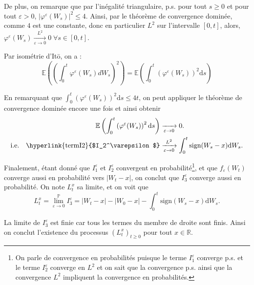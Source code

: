 \documentclass[openany]{book}
\makeatletter
\renewcommand{\P}{\mathds{P}}
\newcommand{\R}{\mathbb{R}}
\newcommand{\E}{\mathbb{E}}
\newcommand{\1}{\mathbbm{1}}
\newcommand{\sign}{\text{sign}}
\renewcommand{\d}{\mathrm{d}}
\renewenvironment{proof}[1][\textbf{\textit{Démonstration}}]{%
  \par\pushQED{\qed}%
  \normalfont\topsep6\p@\@plus6\p@\relax
  \trivlist\item[\hskip\labelsep
    #1\@addpunct{.}]\ignorespaces
}{%
  \popQED\endtrivlist\@endpefalse
}
\theoremstyle{thmfont}
\theoremstyle{deffont}
\theoremstyle{thmfont}
\theoremstyle{deffont}
\makeatother
\begin{document}
\begin{proof}
\noindent De plus, on remarque que par l'inégalité triangulaire, p.s. pour tout $s \geq 0$ et pour tout $\varepsilon > 0$, 
$|\varphi^\varepsilon(W_s)|^2 \leq 4$. Ainsi, par le théorème de convergence dominée, comme $4$ est une constante, donc en particulier $L^2$ sur l'intervalle $[0,t]$, alors, $\varphi^\varepsilon(W_s) \xrightarrow[\varepsilon \to 0]{L^2} 0\;\forall s \in [0,t]$.

\noindent Par isométrie d'Itō, on a :
$$\E\left(\left(\int_0^t \varphi^\varepsilon(W_s) dW_s\right)^2\right) = \E\left(\int_0^t\left(\varphi^\varepsilon(W_s)\right)^2\d s\right)$$

\noindent En remarquant que $\int_0^t \left(\varphi^\varepsilon(W_s)\right)^2\d s \leq 4t$, on peut appliquer le théorème de convergence dominée encore une fois et ainsi obtenir
\begin{align*}
  \E\left(\int_0^t\left(\varphi^\varepsilon(W_s)\right)^2\d s\right) &\xrightarrow[\varepsilon\to0]{} 0.\\
  \text{i.e.}\quad\text{\hyperlink{termI2}{$I_2^\varepsilon$}} &\xrightarrow[\varepsilon\to0]{L^2} \int_0^t \sign(W_s - x) \d W_s.
\end{align*}


\noindent Finalement, étant donné que \hyperlink{termI1}{$I_1^\varepsilon$} et \hyperlink{termI2}{$I_2^\varepsilon$} convergent en probabilité\footnote{On parle de convergence en probabilités puisque le terme \hyperlink{termI1}{$I_1^\varepsilon$} converge p.s. et le terme \hyperlink{termI2}{$I_2^\varepsilon$} converge en $L^2$ et on sait que la convergence p.s. ainsi que la convergence $L^2$ impliquent la convergence en probabilités.}, et que $f_\varepsilon(W_t)$ converge aussi en probabilité vers $|W_t - x|$, on conclut que \hyperlink{termI3}{$I_3^\varepsilon$} converge aussi en probabilité. On note $L_t^x$ sa limite, et on voit que
\begin{equation}
  L_t^x = \lim_{\varepsilon \to 0}^{\P}I_3^\varepsilon = |W_t-x| - |W_0 - x| -  \int_0^t\sign(W_s -x)\d W_s.
  \label{eq:exprTempsLoc}
\end{equation}

\noindent La limite de \hyperlink{termI3}{$I_3^\varepsilon$} est finie car tous les termes du membre de droite sont finis. Ainsi on conclut l'existence du processus $(L_t^x)_{t\geq0}$ pour tout $x \in \R$.


\end{proof}
\end{document}
